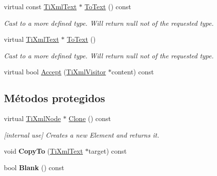 \begin{DoxyCompactItemize}
\item 
\hypertarget{class_ti_xml_text_a895bf34ffad17f7439ab2a52b9651648}{virtual const \hyperlink{class_ti_xml_text}{Ti\-Xml\-Text} $\ast$ \hyperlink{class_ti_xml_text_a895bf34ffad17f7439ab2a52b9651648}{To\-Text} () const }\label{class_ti_xml_text_a895bf34ffad17f7439ab2a52b9651648}

\begin{DoxyCompactList}\small\item\em Cast to a more defined type. Will return null not of the requested type. \end{DoxyCompactList}\item 
\hypertarget{class_ti_xml_text_ae7c3a8fd3e4dbf6c0c4363a943d72f5b}{virtual \hyperlink{class_ti_xml_text}{Ti\-Xml\-Text} $\ast$ \hyperlink{class_ti_xml_text_ae7c3a8fd3e4dbf6c0c4363a943d72f5b}{To\-Text} ()}\label{class_ti_xml_text_ae7c3a8fd3e4dbf6c0c4363a943d72f5b}

\begin{DoxyCompactList}\small\item\em Cast to a more defined type. Will return null not of the requested type. \end{DoxyCompactList}\item 
virtual bool \hyperlink{class_ti_xml_text_a43b9954ebf679557fac1a4453f337b7c}{Accept} (\hyperlink{class_ti_xml_visitor}{Ti\-Xml\-Visitor} $\ast$content) const 
\end{DoxyCompactItemize}
\subsection*{Métodos protegidos}
\begin{DoxyCompactItemize}
\item 
\hypertarget{class_ti_xml_text_adde1869dfb029be50713fbfd8ce4d21f}{virtual \hyperlink{class_ti_xml_node}{Ti\-Xml\-Node} $\ast$ \hyperlink{class_ti_xml_text_adde1869dfb029be50713fbfd8ce4d21f}{Clone} () const }\label{class_ti_xml_text_adde1869dfb029be50713fbfd8ce4d21f}

\begin{DoxyCompactList}\small\item\em \mbox{[}internal use\mbox{]} Creates a new Element and returns it. \end{DoxyCompactList}\item 
\hypertarget{class_ti_xml_text_adcec7d9b6fccfc5777452bb97e6031c1}{void {\bfseries Copy\-To} (\hyperlink{class_ti_xml_text}{Ti\-Xml\-Text} $\ast$target) const }\label{class_ti_xml_text_adcec7d9b6fccfc5777452bb97e6031c1}

\item 
\hypertarget{class_ti_xml_text_a1c120428e3b3cf24d79706e6d2b65aa6}{bool {\bfseries Blank} () const }\label{class_ti_xml_text_a1c120428e3b3cf24d79706e6d2b65aa6}

\end{DoxyCompactItemize}
